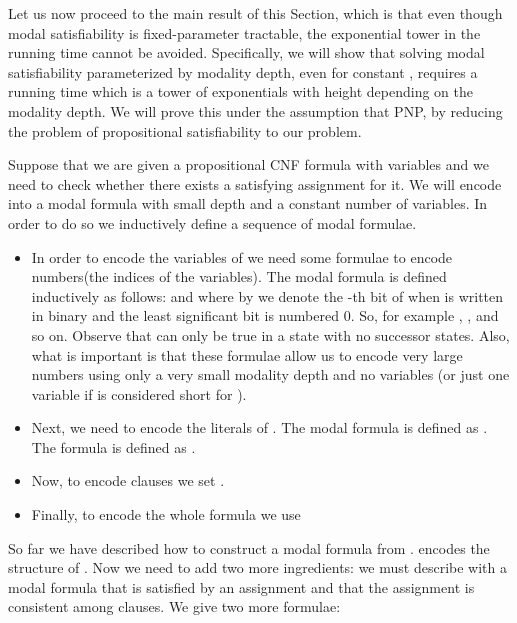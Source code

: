 \documentclass{llncs}
\begin{document}
Let us now proceed to the main result of this Section, which is that even
though modal satisfiability is fixed-parameter tractable, the exponential tower
in the running time cannot be avoided. Specifically, we will show that solving
modal satisfiability parameterized by modality depth, even for constant , 
requires a running time which is a tower of exponentials with height depending
on the modality depth. We will prove this under the assumption that PNP,
by reducing the problem of propositional satisfiability to our problem.

Suppose that we are given a propositional CNF formula  with variables
 and we need to check whether there exists a satisfying
assignment for it.  We will encode  into a modal formula with small
depth and a constant number of variables. In order to do so we inductively
define a sequence of modal formulae.

\newcommand{\LL}{\mathcal{L}} \newcommand{\CC}{\mathcal{C}}
\newcommand{\FF}{\mathcal{F}} \newcommand{\SSS}{\mathcal{S}}
\newcommand{\CCC}{\mathcal{CA}}


\begin{itemize}


\item In order to encode the variables of  we need some formulae to
encode numbers(the indices of the variables). The modal formula
 is defined inductively as follows:  and
 where by  we
denote the -th bit of  when  is written in binary and the
least significant bit is numbered 0. So, for example , ,  and so on.  Observe that
 can only be true in a state with no successor states.  Also,
what is important is that these formulae allow us to encode very large numbers
using only a very small modality depth and no variables (or just one variable
if  is considered short for ).

\item Next, we need to encode the literals of . The modal formula
 is defined as . The
formula  is defined as .

\item Now, to encode clauses we set .

\item Finally, to encode the whole formula we use 

\end{itemize}

So far we have described how to construct a modal formula  from
.  encodes the structure of . Now we need to add
two more ingredients: we must describe with a modal formula that  is
satisfied by an assignment and that the assignment is consistent among clauses.
We give two more formulae:
\end{document}
